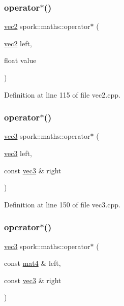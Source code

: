 \subsubsection{\texorpdfstring{operator$\ast$()}{operator*()}\hspace{0.1cm}{\footnotesize\ttfamily [4/8]}}
{\footnotesize\ttfamily \hyperlink{structspork_1_1maths_1_1vec2}{vec2} spork\+::maths\+::operator$\ast$ (\begin{DoxyParamCaption}\item[{\hyperlink{structspork_1_1maths_1_1vec2}{vec2}}]{left,  }\item[{float}]{value }\end{DoxyParamCaption})}



Definition at line 115 of file vec2.\+cpp.

\mbox{\label{namespacespork_1_1maths_ada6a3b00d259a40b306b3a42d2b592b1}} 
\subsubsection{\texorpdfstring{operator$\ast$()}{operator*()}\hspace{0.1cm}{\footnotesize\ttfamily [5/8]}}
{\footnotesize\ttfamily \hyperlink{structspork_1_1maths_1_1vec3}{vec3} spork\+::maths\+::operator$\ast$ (\begin{DoxyParamCaption}\item[{\hyperlink{structspork_1_1maths_1_1vec3}{vec3}}]{left,  }\item[{const \hyperlink{structspork_1_1maths_1_1vec3}{vec3} \&}]{right }\end{DoxyParamCaption})}



Definition at line 150 of file vec3.\+cpp.

\mbox{\label{namespacespork_1_1maths_a69a3ee5d330b2639f489a97456b3d8a9}} 
\subsubsection{\texorpdfstring{operator$\ast$()}{operator*()}\hspace{0.1cm}{\footnotesize\ttfamily [6/8]}}
{\footnotesize\ttfamily \hyperlink{structspork_1_1maths_1_1vec3}{vec3} spork\+::maths\+::operator$\ast$ (\begin{DoxyParamCaption}\item[{const \hyperlink{structspork_1_1maths_1_1mat4}{mat4} \&}]{left,  }\item[{const \hyperlink{structspork_1_1maths_1_1vec3}{vec3} \&}]{right }\end{DoxyParamCaption})}



